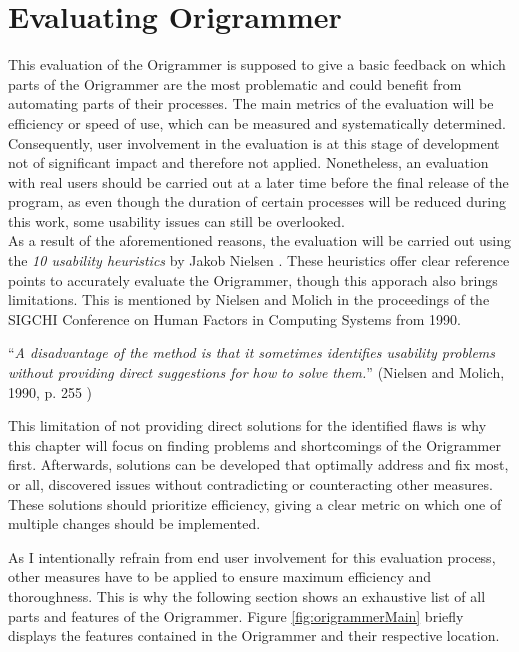 
\section{Evaluating Origrammer}
\label{sec:evaluation}

This evaluation of the Origrammer is supposed to give a basic feedback on which parts of the Origrammer are the most problematic and could benefit from automating parts of their processes. The main metrics of the evaluation will be efficiency or speed of use, which can be measured and systematically determined. Consequently, user involvement in the evaluation is at this stage of development not of significant impact and therefore not applied. Nonetheless, an evaluation with real users should be carried out at a later time before the final release of the program, as even though the duration of certain processes will be reduced during this work, some usability issues can still be overlooked.\\
\newline
As a result of the aforementioned reasons, the evaluation will be carried out using the \emph{10 usability heuristics} by Jakob Nielsen \cite{10usability_heuristics}. These heuristics offer clear reference points to accurately evaluate the Origrammer, though this apporach also brings limitations. This is mentioned by Nielsen and Molich in the proceedings of the SIGCHI Conference on Human Factors in Computing Systems from 1990.

\begin{center}
\enquote{\emph{A disadvantage of the method is that it sometimes identifies usability problems without providing direct suggestions for how to solve them.}} (Nielsen and Molich, 1990, p. 255 \cite{usability_heuristics})
\end{center}

\noindent This limitation of not providing direct solutions for the identified flaws is why this chapter will focus on finding problems and shortcomings of the Origrammer first. Afterwards, solutions can be developed that optimally address and fix most, or all, discovered issues without contradicting or counteracting other measures. These solutions should prioritize efficiency, giving a clear metric on which one of multiple changes should be implemented.

As I intentionally refrain from end user involvement for this evaluation process, other measures have to be applied to ensure maximum efficiency and thoroughness. This is why the following section shows an exhaustive list of all parts and features of the Origrammer. Figure \ref{fig:origrammerMain} briefly displays the features contained in the Origrammer and their respective location.

